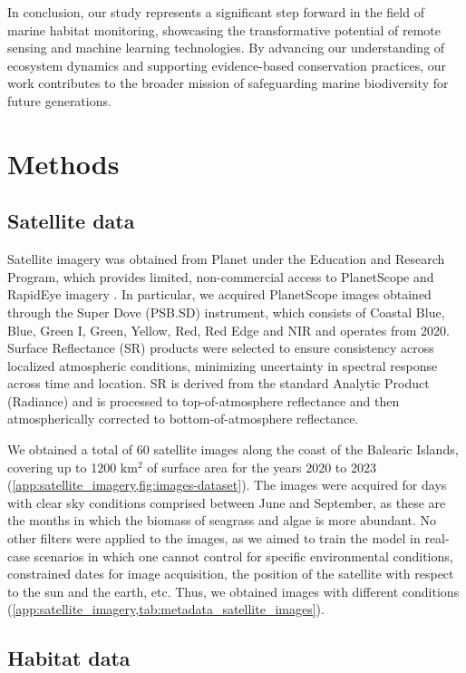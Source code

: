 In conclusion, our study represents a significant step forward in the field of
marine habitat monitoring, showcasing the transformative potential of remote
sensing and machine learning technologies. By advancing our understanding of
ecosystem dynamics and supporting evidence-based conservation practices, our
work contributes to the broader mission of safeguarding marine biodiversity for
future generations.

\section{Methods}

\subsection{Satellite data}

Satellite imagery was obtained from Planet under the Education and Research
Program, which provides limited, non-commercial access to PlanetScope and
RapidEye imagery \cite{planet2017}. In particular, we acquired PlanetScope
images obtained through the Super Dove (PSB.SD) instrument, which consists of
Coastal Blue, Blue, Green I, Green, Yellow, Red, Red Edge and NIR and operates
from 2020. Surface Reflectance (SR) products were selected to ensure
consistency across localized atmospheric conditions, minimizing uncertainty in
spectral response across time and location. SR is derived from the standard
Analytic Product (Radiance) and is processed to top-of-atmosphere reflectance
and then atmospherically corrected to bottom-of-atmosphere reflectance.

We obtained a total of 60 satellite images along the coast of the Balearic
Islands, covering up to 1200 km$^2$ of surface area for the years 2020 to 2023
(\cref{app:satellite_imagery,fig:images-dataset}). The images were
acquired for days with clear sky conditions comprised between June and
September, as these are the months in which the biomass of seagrass and algae
is more abundant. No other filters were applied to the images, as we aimed to
train the model in real-case scenarios in which one cannot control for specific
environmental conditions, constrained dates for image acquisition, the position
of the satellite with respect to the sun and the earth, etc. Thus, we obtained
images with different conditions
(\cref{app:satellite_imagery,tab:metadata_satellite_images}).

\subsection{Habitat data}

